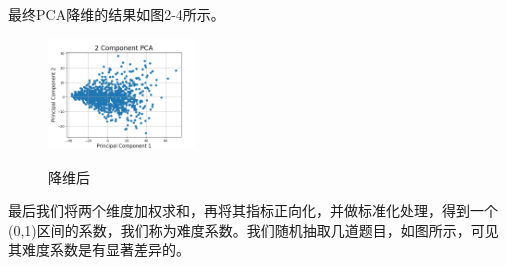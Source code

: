 \documentclass[UTF8]{ctexart}
\begin{document}
	\par 最终PCA降维的结果如图2-4所示。
	\begin{figure}[!htbp]
		\centering
		\includegraphics[width=0.35\textwidth]{Figure_1.png}\\
		\caption{降维后}
	\end{figure}
	\par 最后我们将两个维度加权求和，再将其指标正向化，并做标准化处理，得到一个(0,1)区间的系数，我们称为难度系数。我们随机抽取几道题目，如图所示，可见其难度系数是有显著差异的。
\end{document}

